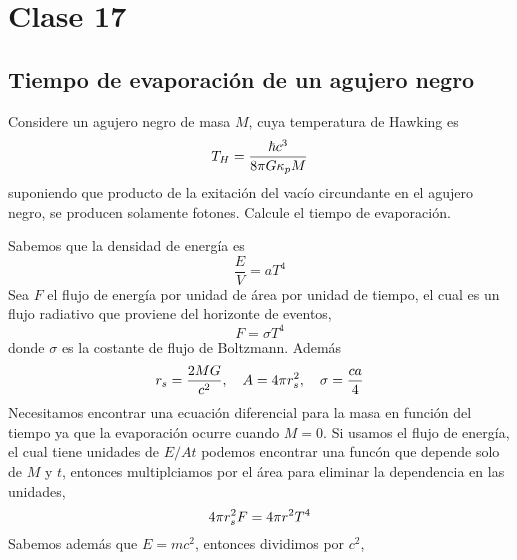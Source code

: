 \section{Clase 17}
\subsection{Tiempo de evaporación de un agujero negro}
\begin{ej}
	Considere un agujero negro de masa $M$, cuya temperatura de Hawking es
	\begin{equation}
  T_H=\frac{\hbar c^3}{8\pi G\kappa_p M}
\end{equation}
suponiendo que producto de la exitación del vacío circundante en el agujero negro, se producen solamente fotones. Calcule el tiempo de evaporación.
\end{ej}

\begin{sol}
	Sabemos que la densidad de energía es
	\begin{equation}
  \frac{E}{V}=aT^4
\end{equation}
Sea $F$ el flujo de energía por unidad de área por unidad de tiempo, el cual es un flujo radiativo que proviene del horizonte de eventos,
\begin{equation}
  F=\sigma T^4
\end{equation}
donde $\sigma$ es la costante de flujo de Boltzmann. Además
\begin{equation}
  r_s=\frac{2MG}{c^2},\quad A=4\pi r_s^2,\quad \sigma=\frac{ca}{4}
\end{equation}
Necesitamos encontrar una ecuación diferencial para la masa en función del tiempo ya que la evaporación ocurre cuando $M=0$. Si usamos el flujo de energía, el cual tiene unidades de $E/At$ podemos encontrar una funcón que depende solo de $M$ y $t$, entonces multiplciamos por el área para eliminar la dependencia en las unidades,
\begin{equation}
  4\pi r_s^2F=4\pi r^2T^4
\end{equation}
Sabemos además que $E=mc^2$, entonces dividimos por $c^2$,

\end{sol}